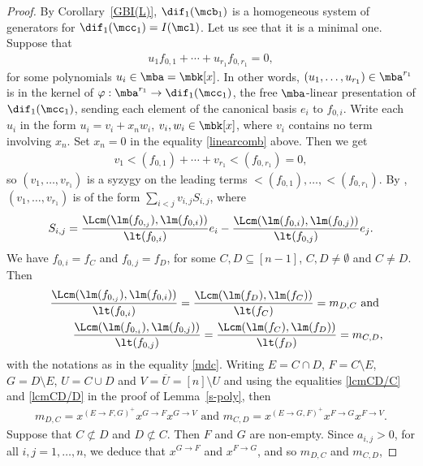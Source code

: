 \begin{proof}
By Corollary~\ref{GBI(L)}, $\dif_1(\mcb_1)$ is a homogeneous system of
generators for $\dif_1(\mcc_1)=I(\mcl)$. Let us see that it is a
minimal one.  Suppose that
\begin{eqnarray}\label{linearcomb}
u_1f_{0,1}+\cdots +u_{r_1}f_{0,r_1}=0,
\end{eqnarray}
for some polynomials $u_i\in \mba=\mbk[x]$. In other words,
$(u_1,\ldots ,u_{r_1})\in\mba^{r_1}$ is in the kernel of
$\varphi:\mba^{r_1}\to \dif_1(\mcc_1)$, the free $\mba$-linear
presentation of $\dif_1(\mcc_1)$, sending each element of the
canonical basis $e_i$ to $f_{0,i}$. Write each $u_i$ in the form
$u_i=v_i+x_nw_i$, $v_i,w_i\in\mbk[x]$, where $v_i$ contains no term
involving $x_n$. Set $x_n=0$ in the equality \eqref{linearcomb}
above. Then we get
\begin{eqnarray*}
v_1\lt(f_{0,1})+\cdots + v_{r_1}\lt(f_{0,r_1})=0,
\end{eqnarray*}
so $(v_1,\ldots ,v_{r_1})$ is a syzygy on the leading terms
$\lt(f_{0,1}),\ldots ,\lt(f_{0,r_1})$.  By
\cite[\S~2.9. Proposition~8, see also Definition~5]{clo}, $(v_1,\ldots
,v_{r_1})$ is of the form $\sum_{i<j}v_{i,j}S_{i,j}$, where
\begin{eqnarray*}
S_{i,j}=\frac{\Lcm(\lm(f_{0,_j}),\lm(f_{0,i}))}{\lt(f_{0,i})}e_i-
\frac{\Lcm(\lm(f_{0,i}),\lm(f_{0,j}))}{\lt(f_{0,j})}e_j.
\end{eqnarray*}
We have $f_{0,i}=f_C$ and $f_{0,j}=f_D$, for some $C,D\subseteq
[n-1]$, $C,D\neq \emptyset$ and $C\neq D$. Then
\begin{eqnarray*}
&&\frac{\Lcm(\lm(f_{0,_j}),\lm(f_{0,i}))}{\lt(f_{0,i})}=
\frac{\Lcm(\lm(f_D),\lm(f_C))}{\lt(f_C)}=m_{D,C}\mbox{ and }
\\&& \frac{\Lcm(\lm(f_{0,_i}),\lm(f_{0,j}))}{\lt(f_{0,j})}=
\frac{\Lcm(\lm(f_C),\lm(f_D))}{\lt(f_D)}=m_{C,D},
\end{eqnarray*}
with the notations as in the equality \eqref{mdc}. Writing $E=C\cap
D$, $F=C\setminus E$, $G=D\setminus E$, $U=C\cup D$ and
$V=\overline{U}=[n]\setminus U$ and using the equalities
\eqref{lcmCD/C} and \eqref{lcmCD/D} in the proof of
Lemma~\ref{s-poly}, then
\begin{eqnarray*}
m_{D,C}=x^{(E\to F,G)^{+}}x^{G\to F}x^{G\to V}\mbox{ and }
m_{C,D}=x^{(E\to G,F)^{+}}x^{F\to G}x^{F\to V}.
\end{eqnarray*}
Suppose that $C\not\subset D$ and $D\not\subset C$. Then $F$ and $G$
are non-empty. Since $a_{i,j}>0$, for all $i,j=1,\ldots ,n$, we deduce
that $x^{G\to F}$ and $x^{F\to G}$, and so $m_{D,C}$ and $m_{C,D}$,

\end{proof}
